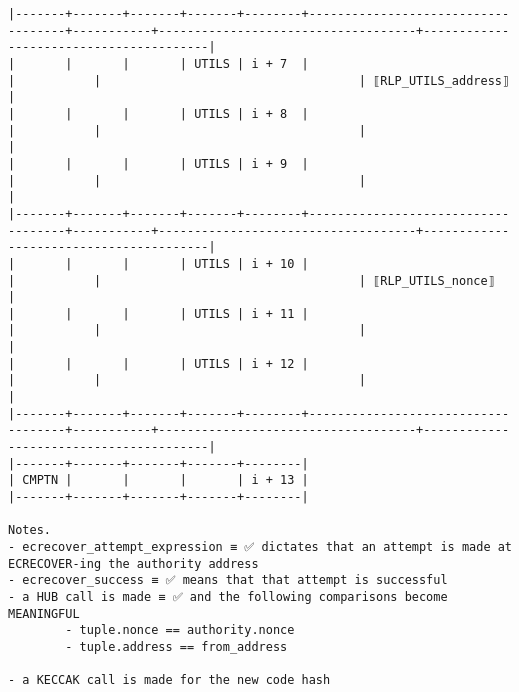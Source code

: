 \documentclass[varwidth=\maxdimen,margin=0.5cm,multi={verbatim}]{standalone}
\begin{document}
\begin{verbatim}
|-------+-------+-------+-------+--------+------------------------------------+-----------+------------------------------------+----------------------------------------|
|       |       |       | UTILS | i + 7  |                                    |           |                                    | ⟦RLP_UTILS_address⟧                    |
|       |       |       | UTILS | i + 8  |                                    |           |                                    |                                        |
|       |       |       | UTILS | i + 9  |                                    |           |                                    |                                        |
|-------+-------+-------+-------+--------+------------------------------------+-----------+------------------------------------+----------------------------------------|
|       |       |       | UTILS | i + 10 |                                    |           |                                    | ⟦RLP_UTILS_nonce⟧                      |
|       |       |       | UTILS | i + 11 |                                    |           |                                    |                                        |
|       |       |       | UTILS | i + 12 |                                    |           |                                    |                                        |
|-------+-------+-------+-------+--------+------------------------------------+-----------+------------------------------------+----------------------------------------|
|-------+-------+-------+-------+--------|
| CMPTN |       |       |       | i + 13 |
|-------+-------+-------+-------+--------|

Notes.
- ecrecover_attempt_expression ≡ ✅ dictates that an attempt is made at ECRECOVER-ing the authority address
- ecrecover_success ≡ ✅ means that that attempt is successful
- a HUB call is made ≡ ✅ and the following comparisons become MEANINGFUL
        - tuple.nonce == authority.nonce
        - tuple.address == from_address 

- a KECCAK call is made for the new code hash

\end{verbatim}
\end{document}
